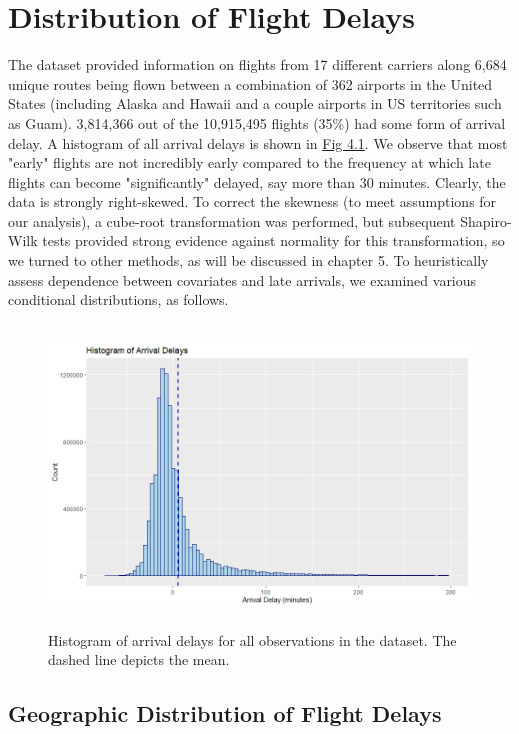 \documentclass[12pt, a4paper, openany]{book}
\newcommand\tab[1][1cm]{\hspace*{#1}}
\begin{document}
	\section{Distribution of Flight Delays}
	\tab The dataset provided information on flights from 17 different carriers along 6,684 unique routes being flown between a combination of 362 airports in the United States (including Alaska and Hawaii and a couple airports in US territories such as Guam). 3,814,366 out of the 10,915,495 flights (35\%) had some form of arrival delay. A histogram of all arrival delays is shown in \underline{Fig 4.1}. We observe that most "early" flights are not incredibly early compared to the frequency at which late flights can become "significantly" delayed, say more than 30 minutes. Clearly, the data is strongly right-skewed. To correct the skewness (to meet assumptions for our analysis), a cube-root transformation was performed, but subsequent Shapiro-Wilk tests provided strong evidence against normality for this transformation, so we turned to other methods, as will be discussed in chapter 5. To heuristically assess dependence between covariates and late arrivals, we examined various conditional distributions, as follows.\\
	\begin{figure}
	\centering
	 \includegraphics[width = .5 \textwidth, height = 8cm]{../figures/PLOTS FOR REPORT/Chapter 4/Figure 4.1}
	 \caption{Histogram of arrival delays for all observations in the dataset. The dashed line depicts the mean.}
	 \end{figure}
		\subsection{Geographic Distribution of Flight Delays}
		
\end{document}
